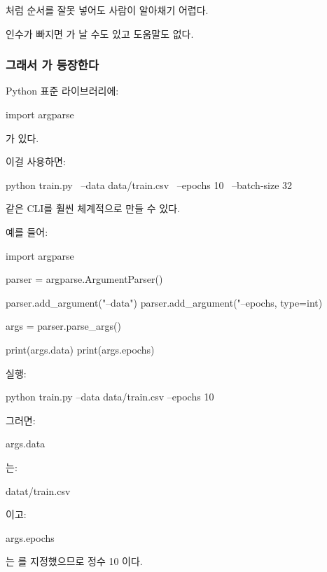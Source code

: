 처럼 순서를 잘못 넣어도 사람이 알아채기 어렵다.

인수가 빠지면 가 날 수도 있고 도움말도 없다.

\subsubsection{그래서 가 등장한다}

Python 표준 라이브러리에:

\begin{dhkcode}
import argparse
\end{dhkcode}

가 있다.

이걸 사용하면:

\begin{dhkzsh}
python train.py \
    --data data/train.csv \
    --epochs 10 \
    --batch-size 32
\end{dhkzsh}

같은 CLI를 훨씬 체계적으로 만들 수 있다.

예를 들어:

\begin{dhkcode}
import argparse

parser = argparse.ArgumentParser()

parser.add_argument("--data")
parser.add_argument("--epochs, type=int)

args = parser.parse_args()

print(args.data)
print(args.epochs)
\end{dhkcode}

실행:

\begin{dhkzsh}
python train.py --data data/train.csv --epochs 10
\end{dhkzsh}

그러면:

\begin{dhkcode}
args.data
\end{dhkcode}

는:

\begin{dhkzsh}
datat/train.csv
\end{dhkzsh}

이고:

\begin{dhkcode}
args.epochs
\end{dhkcode}

는 를 지정했으므로 정수 10 이다.

